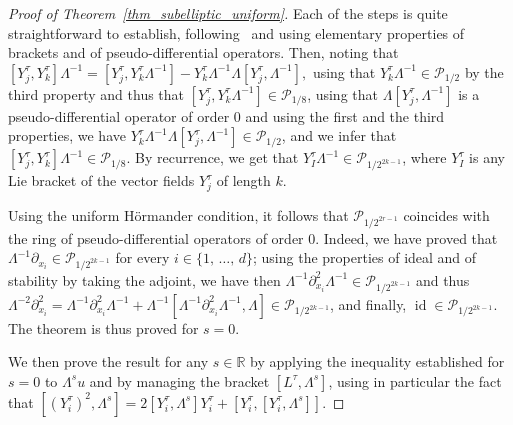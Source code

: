 \documentclass[10pt]{amsart}
\theoremstyle{definition}\newtheorem{defi}[theo]{Definition}\newtheorem{rema}[theo]{Remark}\newtheorem{exam}[theo]{Example}\newtheorem{exem}[theo]{Example}\newtheorem{nota}[theo]{Notation}
\newcommand*\R{\mathbb{R}}
\newcommand{\calP}{\mathcal{P}}
\DeclareMathOperator{\id}{id}
\begin{document}
\begin{proof}[Proof of Theorem~\ref{thm_subelliptic_uniform}]
Each of the steps is quite straightforward to establish, following~\cite{HelfferNier,Kohn1973} and using elementary properties of brackets and of pseudo-differential operators. Then, noting that $ [Y_j^\tau,Y_k^\tau]\Lambda^{-1} = [Y_j^\tau,Y_k^\tau\Lambda^{-1}] - Y_k^\tau\Lambda^{-1} \Lambda[Y_j^\tau,\Lambda^{-1}], $ using that $Y_k^\tau\Lambda^{-1}\in\calP_{1/2}$ by the third property and thus that $[Y_j^\tau,Y_k^\tau\Lambda^{-1}]\in\calP_{1/8}$, using that $\Lambda[Y_j^\tau,\Lambda^{-1}]$ is a pseudo-differential operator of order $0$ and using the first and the third properties, we have $Y_k^\tau\Lambda^{-1} \Lambda[Y_j^\tau,\Lambda^{-1}]\in\calP_{1/2}$, and we infer that $[Y_j^\tau,Y_k^\tau]\Lambda^{-1}\in\calP_{1/8}$. By recurrence, we get that $Y_I^\tau\Lambda^{-1}\in\calP_{1/2^{2k-1}}$, where $Y_I^\tau$ is any Lie bracket of the vector fields $Y_j^\tau$ of length $k$.

Using the uniform H\"ormander condition, it follows that $\calP_{1/2^{2r-1}}$ coincides with the ring of pseudo-differential operators of order $0$. Indeed, we have proved that $\Lambda^{-1} \partial_{x_i} \in \calP_{1/2^{2k-1}}$ for every $i\in\{1,\,\ldots,\,d\}$; using the properties of ideal and of stability by taking the adjoint, we have then $\Lambda^{-1} \partial_{x_i}^2 \Lambda^{-1} \in \calP_{1/2^{2k-1}}$ and thus $\Lambda^{-2} \partial_{x_i}^2 = \Lambda^{-1} \partial_{x_i}^2 \Lambda^{-1} + \Lambda^{-1} [\Lambda^{-1} \partial_{x_i}^2 \Lambda^{-1}, \Lambda] \in \calP_{1/2^{2k-1}}$, and finally, $\id \in \calP_{1/2^{2k-1}}$. The theorem is thus proved for $s=0$.

We then prove the result for any $s\in\R$ by applying the inequality established for $s=0$ to $\Lambda^s u$ and by managing the bracket $[L^\tau,\Lambda^s]$, using in particular the fact that $[(Y_i^\tau)^2,\Lambda^s] = 2[Y_i^\tau,\Lambda^s]Y_i^\tau+[Y_i^\tau,[Y_i^\tau,\Lambda^s]]$.
\end{proof}
\end{document}
